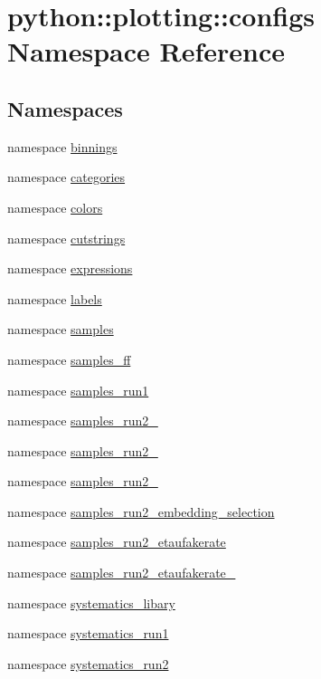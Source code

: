 \hypertarget{namespacepython_1_1plotting_1_1configs}{
\section{python::plotting::configs Namespace Reference}
\label{namespacepython_1_1plotting_1_1configs}
}
\subsection*{Namespaces}
\begin{DoxyCompactItemize}
\item 
namespace \hyperlink{namespacepython_1_1plotting_1_1configs_1_1binnings}{binnings}
\item 
namespace \hyperlink{namespacepython_1_1plotting_1_1configs_1_1categories}{categories}
\item 
namespace \hyperlink{namespacepython_1_1plotting_1_1configs_1_1colors}{colors}
\item 
namespace \hyperlink{namespacepython_1_1plotting_1_1configs_1_1cutstrings}{cutstrings}
\item 
namespace \hyperlink{namespacepython_1_1plotting_1_1configs_1_1expressions}{expressions}
\item 
namespace \hyperlink{namespacepython_1_1plotting_1_1configs_1_1labels}{labels}
\item 
namespace \hyperlink{namespacepython_1_1plotting_1_1configs_1_1samples}{samples}
\item 
namespace \hyperlink{namespacepython_1_1plotting_1_1configs_1_1samples__ff}{samples\_\-ff}
\item 
namespace \hyperlink{namespacepython_1_1plotting_1_1configs_1_1samples__run1}{samples\_\-run1}
\item 
namespace \hyperlink{namespacepython_1_1plotting_1_1configs_1_1samples__run2__2015}{samples\_\-run2\_}
\item 
namespace \hyperlink{namespacepython_1_1plotting_1_1configs_1_1samples__run2__2016}{samples\_\-run2\_}
\item 
namespace \hyperlink{namespacepython_1_1plotting_1_1configs_1_1samples__run2__2017}{samples\_\-run2\_}
\item 
namespace \hyperlink{namespacepython_1_1plotting_1_1configs_1_1samples__run2__embedding__selection}{samples\_\-run2\_\-embedding\_\-selection}
\item 
namespace \hyperlink{namespacepython_1_1plotting_1_1configs_1_1samples__run2__etaufakerate}{samples\_\-run2\_\-etaufakerate}
\item 
namespace \hyperlink{namespacepython_1_1plotting_1_1configs_1_1samples__run2__etaufakerate__2016}{samples\_\-run2\_\-etaufakerate\_}
\item 
namespace \hyperlink{namespacepython_1_1plotting_1_1configs_1_1systematics__libary}{systematics\_\-libary}
\item 
namespace \hyperlink{namespacepython_1_1plotting_1_1configs_1_1systematics__run1}{systematics\_\-run1}
\item 
namespace \hyperlink{namespacepython_1_1plotting_1_1configs_1_1systematics__run2}{systematics\_\-run2}
\end{DoxyCompactItemize}
